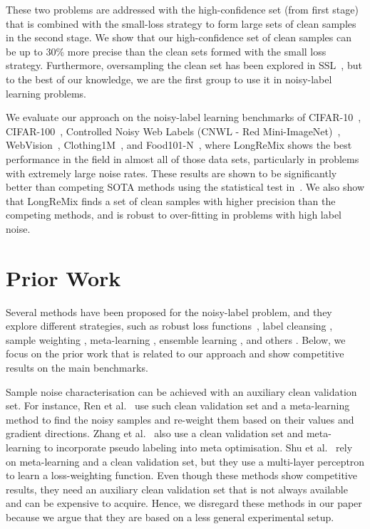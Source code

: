 \documentclass[review]{elsarticle}
\begin{document}
\noindent These two problems are addressed with the  high-confidence set (from first stage) that is combined with the small-loss strategy to form large sets of clean samples in the second stage.
We show that our high-confidence set of clean samples can be up to 30\% more precise than the clean sets formed with the small loss strategy.
Furthermore, oversampling the clean set has been explored in SSL~\cite{tarvainen2017mean, chen2018semi,iscen2019label,arazo2020pseudo}, but to the best of our knowledge, we are the first group to use it in noisy-label learning problems.


We evaluate our approach on the noisy-label learning benchmarks of CIFAR-10~\cite{krizhevsky2009learning}, CIFAR-100~\cite{krizhevsky2009learning},
Controlled Noisy Web Labels (CNWL - Red Mini-ImageNet)~\cite{jiang2020beyond},
WebVision~\cite{li2017WebVision}, Clothing1M~\cite{xiao2015learning}, and Food101-N~\cite{lee2018cleannet}, where LongReMix shows the best performance in the field in almost all of those data sets, particularly in problems with extremely large noise rates. 
These results are shown to be significantly better than  competing SOTA methods using the statistical test in~\cite{demvsar2006statistical}.
We also show that LongReMix finds a set of clean samples with higher precision than the competing methods, and is robust to over-fitting in problems with high label noise.


\section{Prior Work}

Several methods have been proposed for the noisy-label problem, and they explore different strategies, such as robust loss functions~\cite{ma2020normalized,wang2019imae, wang2019symmetric}, label cleansing \cite{jaehwan2019photometric, yuan2018iterative}, sample weighting \cite{ren2018learning}, meta-learning \cite{han2018pumpout,sun2021learning}, ensemble learning \cite{miao2015rboost}, and others \cite{yu2018learning, kim2019nlnl}. Below, we focus on the prior work that is related to our approach and show competitive results on the main benchmarks.


Sample noise characterisation can be achieved with an auxiliary clean validation set.  For instance, Ren et al.~\cite{ren2018learning} use such clean validation set and a meta-learning method to find the noisy samples and re-weight them based on their values and gradient directions.  
Zhang et al.~\cite{zhang2020distilling} also use a clean validation set and meta-learning to incorporate pseudo labeling
into meta optimisation.
Shu et al.~\cite{shu2019meta} rely on meta-learning and a clean validation set, but they use a multi-layer perceptron to learn a loss-weighting function. 
Even though these methods show competitive results, 
they need an auxiliary clean validation set that is not always available and can be expensive to acquire.
Hence, we disregard these methods in our paper because we argue that they are based on a less general experimental setup. 
\end{document}
